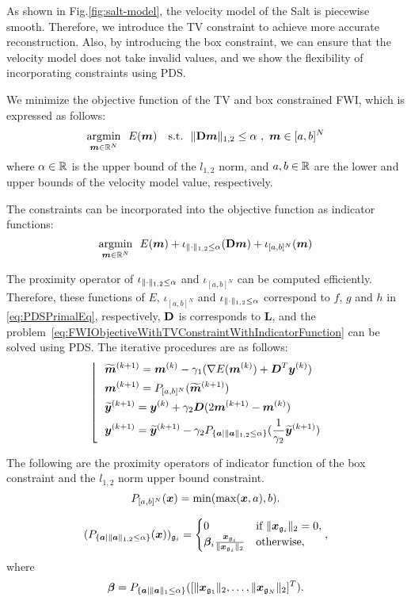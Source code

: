 As shown in Fig.\ref{fig:salt-model}, the velocity model of the Salt is piecewise smooth.
Therefore, we introduce the TV constraint to achieve more accurate reconstruction.
Also, by introducing the box constraint, we can ensure that the velocity model does not take invalid values, and we show the flexibility of incorporating constraints using PDS.

We minimize the objective function of the TV and box constrained FWI, which is expressed as follows:
\begin{equation} \label{eq:FWIObjectiveWithTVConstraint} \argmin{\velModel \in \realNumber^N} \ \ \FWIObjectiveWithTVConstraint \end{equation}
where $\alpha \in \mathbb{R}$ is the upper bound of the $l_{1,2}$ norm, and $a, b \in \mathbb{R}$ are the lower and upper bounds of the velocity model value, respectively.

The constraints can be incorporated into the objective function as indicator functions:
\begin{equation} \label{eq:FWIObjectiveWithTVConstraintWithIndicatorFunction} \argmin{\velModel \in \realNumber^N} \ \ \FWIObjectiveWithTVConstraintWithIndicatorFunction \end{equation}

The proximity operator of $\iota_{\lVert \cdot \rVert _{1,2} \le \alpha}$ and $\iota_{[a,b]^N}$ can be computed efficiently.
Therefore, these functions of $E$, $\iota_{[a,b]^N}$ and $\iota_{\lVert \cdot \rVert _{1,2} \le \alpha}$ correspond to $f$, $g$ and $h$ in \eqref{eq:PDSPrimalEq}, respectively, $\mathbf{D}$ is corresponds to $\bm{L}$, and the problem~\eqref{eq:FWIObjectiveWithTVConstraintWithIndicatorFunction} can be solved using PDS.
The iterative procedures are as follows:
\begin{equation} \label{eq:FWIWithPDS} \left \lfloor \ \ \begin{aligned} & \widetilde{\bm{m}}^{(k+1)} = \bm{m}^{(k)} - \gamma_1( \nabla E(\bm{m}^{(k)}) + \bm{D}^T \bm{y}^{(k)} ) \\ & \bm{m}^{(k+1)} = P_{[a,b]^N}(\widetilde{\bm{m}}^{(k+1)}) \\ & \widetilde{\bm{y}}^{(k+1)} = \bm{y}^{(k)} + \gamma_2 \bm{D} (2\bm{m}^{(k+1)} - \bm{m}^{(k)}) \\ & \bm{y}^{(k+1)} = \widetilde{\bm{y}}^{(k+1)} - \gamma_2 P_{ \{ \bm a \mid \lVert  \bm a  \rVert _{1,2} \le \alpha \} }(\frac 1 {\gamma_2} {\widetilde{\bm y}^{(k+1)}}) \end{aligned} \right. \notag \end{equation}


The following are the proximity operators of indicator function of the box constraint and the $l_{1,2}$ norm upper bound constraint.
\begin{equation} \label{eq:ProximityOperatorForBoxConstraint} P_{[a,b]^N}(\bm{x}) = \text{min}( \text{max} (\bm{x}, a), b). \end{equation}

\begin{equation} \label{eq:ProximityOperatorForL12Ball} (P_{ \{ \bm a \mid \lVert  \bm a  \rVert _{1,2} \le \alpha \} }(\bm{x}))_{\mathfrak{g}_i} = \begin{cases} 0 & \text{if} \ \lVert \bm{x}_{\mathfrak{g}_i} \rVert _2 = 0, \\ \bm \beta_i \frac {\bm{x}_{\mathfrak{g}_i}} {\lVert \bm{x}_{\mathfrak{g}_i} \rVert _2} & \text{otherwise}, \end{cases} \\ , \end{equation}
where
\begin{equation} \label{eq:ProximityOperatorForL12BallWhere} \bm \beta = P_{ \{ \bm a \mid \lVert  \bm a  \rVert _1 \le \alpha \} }({[ \lVert  \bm{x}_{\mathfrak{g}_1}  \rVert _2, \ldots, \lVert  \bm{x}_{\mathfrak{g}_N}  \rVert _2 ]^T}). \\  \notag \end{equation}

